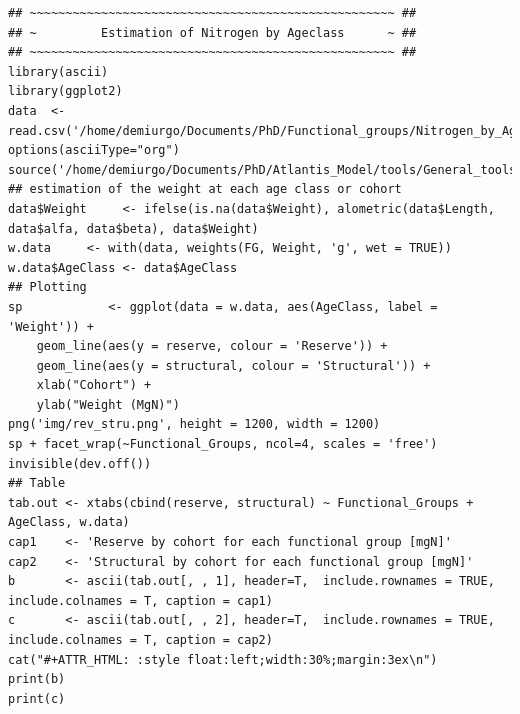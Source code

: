 \documentclass[11pt]{article}
\begin{document}
\begin{itemize}
\begin{verbatim}
## ~~~~~~~~~~~~~~~~~~~~~~~~~~~~~~~~~~~~~~~~~~~~~~~~~~~ ##
## ~         Estimation of Nitrogen by Ageclass      ~ ##
## ~~~~~~~~~~~~~~~~~~~~~~~~~~~~~~~~~~~~~~~~~~~~~~~~~~~ ##
library(ascii)
library(ggplot2)
data  <- read.csv('/home/demiurgo/Documents/PhD/Functional_groups/Nitrogen_by_Agegroup/age_length.csv')
options(asciiType="org")
source('/home/demiurgo/Documents/PhD/Atlantis_Model/tools/General_tools/Atlantis_tools.R')
## estimation of the weight at each age class or cohort
data$Weight     <- ifelse(is.na(data$Weight), alometric(data$Length, data$alfa, data$beta), data$Weight)
w.data     <- with(data, weights(FG, Weight, 'g', wet = TRUE))
w.data$AgeClass <- data$AgeClass
## Plotting
sp            <- ggplot(data = w.data, aes(AgeClass, label = 'Weight')) +
    geom_line(aes(y = reserve, colour = 'Reserve')) +
    geom_line(aes(y = structural, colour = 'Structural')) +
    xlab("Cohort") +
    ylab("Weight (MgN)")
png('img/rev_stru.png', height = 1200, width = 1200)
sp + facet_wrap(~Functional_Groups, ncol=4, scales = 'free')
invisible(dev.off())
## Table
tab.out <- xtabs(cbind(reserve, structural) ~ Functional_Groups + AgeClass, w.data)
cap1    <- 'Reserve by cohort for each functional group [mgN]'
cap2    <- 'Structural by cohort for each functional group [mgN]'
b       <- ascii(tab.out[, , 1], header=T,  include.rownames = TRUE, include.colnames = T, caption = cap1)
c       <- ascii(tab.out[, , 2], header=T,  include.rownames = TRUE, include.colnames = T, caption = cap2)
cat("#+ATTR_HTML: :style float:left;width:30%;margin:3ex\n")
print(b)
print(c)
\end{verbatim}
\end{itemize}
\end{document}
